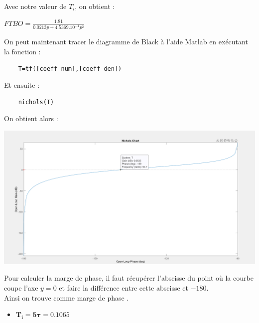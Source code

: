 \documentclass[12pt]{article}
\begin{document}
\normalsize Avec notre valeur de $T_i$, on obtient :
\begin{center}
    \large$FTBO = \frac{1.81}{0.0213p + 4.5369.10^{-4}p^2}$
\end{center}
\normalsize On peut maintenant tracer le diagramme de Black à l'aide Matlab en exécutant la fonction :
\begin{verbatim}
    T=tf([coeff num],[coeff den]) 
\end{verbatim}
Et ensuite :
\begin{verbatim}
    nichols(T)
\end{verbatim}
On obtient alors : 
\begin{center}
    \includegraphics[width = 19 cm]{TP2 Simulink/Syst_1/Ti=tau_syst_1_Black.png}
\end{center}
Pour calculer la marge de phase, il faut récupérer l'abscisse du point où la courbe coupe l'axe $y=0$ et faire la différence entre cette abscisse et $-180$.
\\Ainsi on trouve comme marge de phase .
\newpage
\begin{itemize}
    \item \large $\mathbf{T_i = 5\tau = 0.1065}$
\end{itemize}
\end{document}
